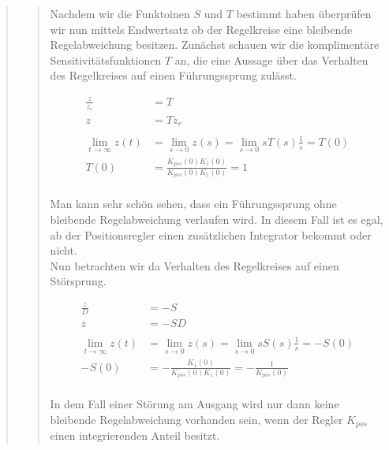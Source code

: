 \begin{quote}
\begin{quote}
        Nachdem wir die Funktoinen $S$ und $T$ bestimmt haben überprüfen wir nun mittels Endwertsatz
        ob der Regelkreise eine bleibende Regelabweichung besitzen. Zunächst schauen wir die komplimentäre
        Sensitivitätsfunktionen $T$ an, die eine Aussage über das Verhalten des Regelkreises auf einen Führungssprung
        zulässt.
        
        \begin{equation*}
        	\begin{split}
        		\frac{z}{z_r} &= T\\
        		z &= T z_r\\ \\
        		\lim\limits_{t \rightarrow \infty}{z(t)} &= \lim\limits_{s \rightarrow 0}{z(s)} = \lim\limits_{s \rightarrow
        		0}{s T(s)\frac{1}{s}} = T(0)\\
        		T(0) &=  \frac{K_{pos}(0) K_1 (0)}{K_{pos}(0) K_1(0)} = 1\\
        	\end{split}
        \end{equation*}
        
        Man kann sehr schön sehen, dass ein Führungssprung ohne bleibende Regelabweichung verlaufen wird. In diesem Fall
        ist es egal, ab der Positionsregler einen zusätzlichen Integrator bekommt oder nicht.\\
        
        Nun betrachten wir da Verhalten des Regelkreises auf einen Störsprung.
        
        \begin{equation*}
        	\begin{split}
        		\frac{z}{D} &= -S\\
        		z &= -S D\\ \\
                \lim\limits_{t \rightarrow \infty}{z(t)} &= \lim\limits_{s \rightarrow 0}{z(s)} = \lim\limits_{s \rightarrow
                0}{s S(s)\frac{1}{s}} = -S(0)\\
                -S(0) &=  -\frac{K_1 (0)}{K_{pos}(0) K_1(0)} = -\frac{1}{K_{pos}(0)}\\        		
        	\end{split}
        \end{equation*}
        
        In dem Fall einer Störung am Ausgang wird nur dann keine bleibende Regelabweichung vorhanden sein, wenn der
        Regler $K_{pos}$ einen integrierenden Anteil besitzt.
        





\end{quote}
\end{quote}
